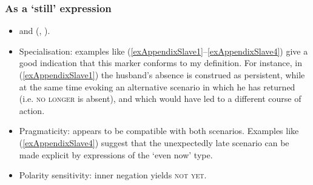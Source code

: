 \subsubsection{As a \lq{}still\rq{ }expression}
\begin{itemize}
	\sloppy
	\item \textcite[167]{SlaveyTopicalDictionary} and \citeauthor{Rice1978} (\citeyear[561]{Rice1978}, \citeyear[158]{Rice1989}).
	\item Specialisation: examples like (\ref{exAppendixSlave1}–\ref{exAppendixSlave4}) give a good indication that this marker conforms to my definition. For instance, in (\ref{exAppendixSlave1}) the husband's absence is construed as persistent, while at the same time evoking an alternative scenario in which he has returned (i.e. \textsc{no longer} is absent), and which would have led to a different course of action.
	\item Pragmaticity: appears to be compatible with both scenarios. Examples like (\ref{exAppendixSlave4}) suggest that the unexpectedly late scenario can be made explicit by expressions of the \lq even now\rq{ }type.
	\item Polarity sensitivity: inner negation yields \textsc{not yet}.
\end{itemize}

